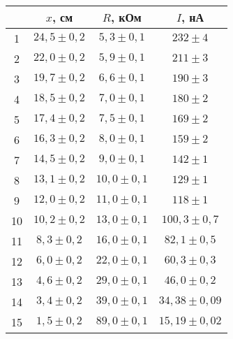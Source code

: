 \begin{tabular}{cccc}
\toprule
 & $x$, см & $R$, кОм & $I$, нА \\
\midrule
1 & $24,5 \pm 0,2$ & $5,3 \pm 0,1$ & $232 \pm 4$ \\
2 & $22,0 \pm 0,2$ & $5,9 \pm 0,1$ & $211 \pm 3$ \\
3 & $19,7 \pm 0,2$ & $6,6 \pm 0,1$ & $190 \pm 3$ \\
4 & $18,5 \pm 0,2$ & $7,0 \pm 0,1$ & $180 \pm 2$ \\
5 & $17,4 \pm 0,2$ & $7,5 \pm 0,1$ & $169 \pm 2$ \\
6 & $16,3 \pm 0,2$ & $8,0 \pm 0,1$ & $159 \pm 2$ \\
7 & $14,5 \pm 0,2$ & $9,0 \pm 0,1$ & $142 \pm 1$ \\
8 & $13,1 \pm 0,2$ & $10,0 \pm 0,1$ & $129 \pm 1$ \\
9 & $12,0 \pm 0,2$ & $11,0 \pm 0,1$ & $118 \pm 1$ \\
10 & $10,2 \pm 0,2$ & $13,0 \pm 0,1$ & $100,3 \pm 0,7$ \\
11 & $8,3 \pm 0,2$ & $16,0 \pm 0,1$ & $82,1 \pm 0,5$ \\
12 & $6,0 \pm 0,2$ & $22,0 \pm 0,1$ & $60,3 \pm 0,3$ \\
13 & $4,6 \pm 0,2$ & $29,0 \pm 0,1$ & $46,0 \pm 0,2$ \\
14 & $3,4 \pm 0,2$ & $39,0 \pm 0,1$ & $34,38 \pm 0,09$ \\
15 & $1,5 \pm 0,2$ & $89,0 \pm 0,1$ & $15,19 \pm 0,02$ \\
\bottomrule
\end{tabular}